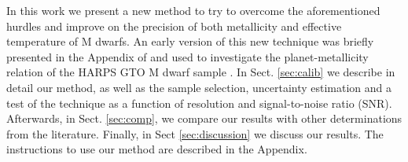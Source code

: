 \documentclass[referee]{aa}
\begin{document}
In this work we present a new method to try to overcome the aforementioned hurdles and improve on the precision of both metallicity and effective temperature of M dwarfs. An early version of this new technique was briefly presented in the Appendix of \citet{Neves-2013} and used to investigate the planet-metallicity relation of the HARPS GTO M dwarf sample \citep{Bonfils-2013}. In Sect. \ref{sec:calib} we describe in detail our method, as well as the sample selection, uncertainty estimation and a test of the technique as a function of resolution and signal-to-noise ratio (SNR). Afterwards, in Sect. \ref{sec:comp}, we compare our results with other determinations from the literature. Finally, in Sect \ref{sec:discussion} we discuss our results. The instructions to use our method are described in the Appendix.




\end{document}
